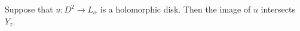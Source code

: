 


    Suppose that $u: D^2\to L_\alpha$ is a holomorphic disk. Then the image of $u$ intersects $Y_z$.
